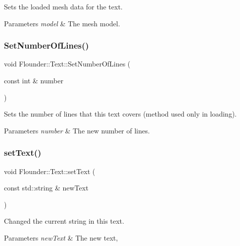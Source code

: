 Sets the loaded mesh data for the text. 


\begin{DoxyParams}{Parameters}
{\em model} & The mesh model. \\
\hline
\end{DoxyParams}
\mbox{\label{class_flounder_1_1_text_a04dad0122e7315f677cf9ad4c6b3ffa8}} 
\subsubsection{\texorpdfstring{Set\+Number\+Of\+Lines()}{SetNumberOfLines()}}
{\footnotesize\ttfamily void Flounder\+::\+Text\+::\+Set\+Number\+Of\+Lines (\begin{DoxyParamCaption}\item[{const int \&}]{number }\end{DoxyParamCaption})\hspace{0.3cm}{\ttfamily [inline]}}



Sets the number of lines that this text covers (method used only in loading). 


\begin{DoxyParams}{Parameters}
{\em number} & The new number of lines. \\
\hline
\end{DoxyParams}
\mbox{\label{class_flounder_1_1_text_a88aeeebb9d93dce75c8ffd7142a3a2cd}} 
\subsubsection{\texorpdfstring{set\+Text()}{setText()}}
{\footnotesize\ttfamily void Flounder\+::\+Text\+::set\+Text (\begin{DoxyParamCaption}\item[{const std\+::string \&}]{new\+Text }\end{DoxyParamCaption})}



Changed the current string in this text. 


\begin{DoxyParams}{Parameters}
{\em new\+Text} & The new text, \\
\hline
\end{DoxyParams}
\mbox{\label{class_flounder_1_1_text_ac3bd171e773e46179ab55e95a8493995}} 
